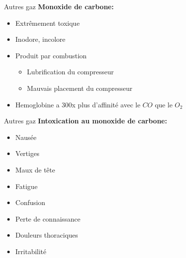 	\begin{frame}{Autres gaz}  
		\textbf{Monoxide de carbone:}	
		\begin{itemize}
			\item Extrêmement toxique
			\item Inodore, incolore
			\item Produit par combustion
			\begin{itemize}
				\item Lubrification du compresseur
				\item Mauvais placement du compresseur
			\end{itemize}
			\item Hemoglobine a 300x plus d'affinité avec le $CO$ que le $O_2$
		\end{itemize}
	\end{frame}

	\begin{frame}{Autres gaz}  
		\textbf{Intoxication au monoxide de carbone:}	
		\begin{itemize}
			\item Nausée
			\item Vertiges
			\item Maux de tête
			\item Fatigue
			\item Confusion
			\item Perte de connaissance
			\item Douleurs thoraciques
			\item Irritabilité
		\end{itemize}
	\end{frame}